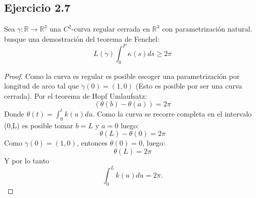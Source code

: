 \documentclass[12pt]{article}
\begin{document}
\subsection*{Ejercicio 2.7}
Sea $\gamma : \mathbb R \rightarrow \mathbb R^3$ una $C^2$-curva regular cerrada en $\mathbb R ^3$ con parametrizaci\'on natural. busque una demostraci\'on del teorema de Fenchel:
\begin{equation*}
L(\dot{\gamma})\int_{0}^{P} \kappa(s)ds \geq 2\pi
\end{equation*}
\begin{proof}
Como la curva es regular es posible escoger una parametrizaci\'on por longitud de arco tal que $\dot{\gamma}(0)=(1,0)$ (Esto es posible por ser una curva cerrada). Por el teorema de Hopf Umlaufsatz: %
\begin{equation*}
(\theta(b)-\theta(a))=2\pi
\end{equation*}
Donde $\theta(t)=\int_{0}^{t} k(u) du$. Como la curva se recorre completa en el intervalo (0,L) es posible tomar $b=L$ y $a=0$ luego:
\begin{equation*}
\theta(L)-\theta(0)=2\pi
\end{equation*}
Como $\dot{\gamma}(0)=(1,0)$, entonces $\theta(0)=0$, luego: %
\begin{equation*}
\theta(L)=2\pi
\end{equation*}
Y por lo tanto
\begin{equation*}
\int_{0}^{L} k(u) du = 2\pi.
\end{equation*}
\end{proof}
\vspace{2in} %

\vspace{3in}
\end{document}
